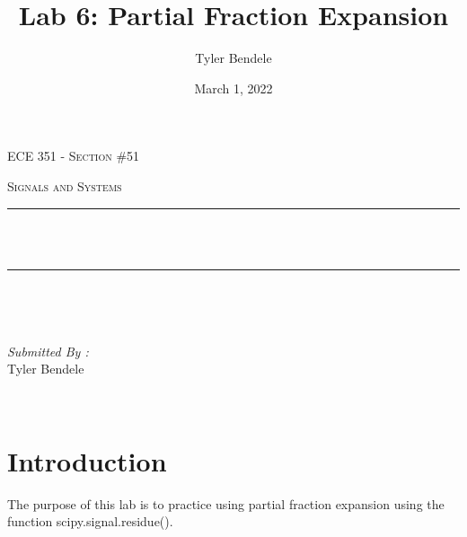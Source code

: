 \documentclass[12pt]{report}
\title{Lab 6: Partial Fraction Expansion}
\author{Tyler Bendele}
\date{March 1, 2022}
\makeatletter
\let\thetitle\@title
\makeatother
\begin{document}
\begin{titlepage}
\centering
\vspace*{0.5 cm}

\begin{center}    \textsc{\Large   ECE 351 - Section \#51 }\\[2.0 cm]
\end{center}%
\textsc{\Large Signals and Systems  }\\[0.5 cm] %

\rule{\linewidth}{0.2 mm} \\[0.4 cm]
{ \huge \bfseries \thetitle}\\
\rule{\linewidth}{0.2 mm} \\[1.5 cm]
\begin{minipage}{0.4\textwidth}
\begin{flushleft} \large
\end{flushleft}
\end{minipage}~
\begin{minipage}{0.4\textwidth}
\begin{flushright} \large
\emph{Submitted By :} \\
Tyler Bendele
\end{flushright}
\end{minipage}\\[2 cm]
\end{titlepage}
\tableofcontents
\pagebreak
\renewcommand{\thesection}{\arabic{section}}
\section{Introduction}
The purpose of this lab is to practice using partial fraction expansion
using the function scipy.signal.residue().
\end{document}

